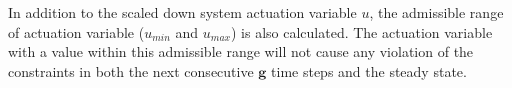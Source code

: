   
  In addition to the scaled down system actuation variable \begin{math} u \end{math}, the admissible range of actuation 
  variable (\begin{math} u_{min} \end{math} and \begin{math} u_{max} \end{math}) is also calculated. The actuation 
  variable with a value within this admissible range will not cause any violation of the constraints in both the next consecutive 
  \begin{math} \textbf{g} \end{math} time steps and the steady state.



